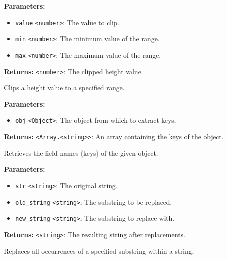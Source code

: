\documentclass[12pt,a4paper]{article}
\begin{document}
\noindent \textbf{Parameters:}
\begin{itemize}
  \item \texttt{value} \texttt{<number>}: The value to clip.
  \item \texttt{min} \texttt{<number>}: The minimum value of the range.
  \item \texttt{max} \texttt{<number>}: The maximum value of the range.
\end{itemize}

\noindent \textbf{Returns:} \texttt{<number>}: The clipped height value.

\noindent Clips a height value to a specified range.

\vspace{5mm}
\noindent {}


\noindent \textbf{Parameters:}
\begin{itemize}
  \item \texttt{obj} \texttt{<Object>}: The object from which to extract keys.
\end{itemize}

\noindent \textbf{Returns:} \texttt{<Array.<string>>}: An array containing the keys of the object.

\noindent Retrieves the field names (keys) of the given object.

\vspace{5mm}
\noindent {}


\noindent \textbf{Parameters:}
\begin{itemize}
  \item \texttt{str} \texttt{<string>}: The original string.
  \item \texttt{old\_string} \texttt{<string>}: The substring to be replaced.
  \item \texttt{new\_string} \texttt{<string>}: The substring to replace with.
\end{itemize}

\noindent \textbf{Returns:} \texttt{<string>}: The resulting string after replacements.

\noindent Replaces all occurrences of a specified substring within a string.

\vspace{5mm}
\noindent {}
\end{document}
